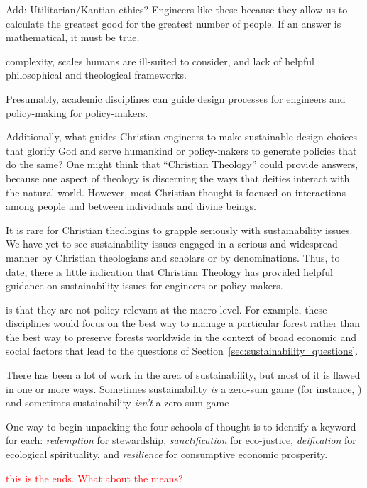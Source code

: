 \documentclass[12pt]{article}
\newcommand{\ins}[1]{\textcolor{red}{#1}}
\begin{document}
Add: Utilitarian/Kantian ethics? Engineers like these because they allow us to calculate the greatest good for the greatest number of people.
If an answer is mathematical, it must be true.


complexity, scales humans are ill-suited to consider, 
and lack of helpful philosophical and theological frameworks.

Presumably, academic disciplines can guide design processes for engineers
and policy-making for policy-makers.




Additionally, what guides Christian engineers to make sustainable design choices
that glorify God and serve humankind
or policy-makers to generate policies that do the same?
One might think that ``Christian Theology'' could provide answers, because
one aspect of theology is discerning the 
ways that deities interact with the natural world. 
However, most Christian thought is focused on interactions among people 
and between individuals and divine beings.

It is rare for Christian theologins to grapple seriously with 
sustainability issues.
We have yet to see sustainability issues engaged in a serious and widespread manner
by Christian theologians and scholars or by denominations.
Thus, to date, there is little indication that Christian Theology 
has provided helpful guidance on sustainability issues
for engineers or policy-makers.



is that they are not policy-relevant
at the macro level. 
For example, these disciplines would focus on the best way to manage a particular forest 
rather than the best way to preserve forests worldwide
in the context of broad economic and social factors
that lead to the questions of Section~\ref{sec:sustainability_questions}.

There has been a lot of work in the area of sustainability, but most of it is flawed in one or more ways.
Sometimes sustainability \emph{is} a zero-sum game 
(for instance, )
and sometimes sustainability \emph{isn't} a zero-sum game 



One way to begin unpacking the four schools of thought 
is to identify a keyword for each:
\emph{redemption} for stewardship, 
\emph{sanctification} for eco-justice,
\emph{deification} for ecological spirituality, and
\emph{resilience} for consumptive economic prosperity.



\ins{this is the ends. What about the means?}
\end{document}
